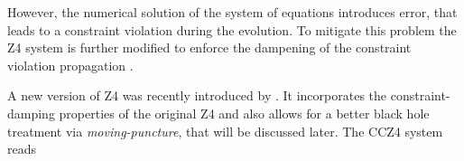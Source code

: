 \documentclass[11pt,a4paper,headinclude=true,DIV=14,BCOR=8mm,chapterprefix,listof=totoc,twoside,openright,abstracton]{scrbook}
\begin{document}
However, the numerical solution of the system of equations introduces error, that leads to a constraint violation during the evolution. To mitigate this problem the Z4 system is further modified to enforce the dampening of the constraint violation propagation \cite{Gundlach:2005eh}.

A new version of Z4 was recently introduced by \cite{Alic:2011gg}. It incorporates the constraint-damping properties of the original Z4 and also allows for a better black hole treatment via \textit{moving-puncture}, that will be discussed later. 
The CCZ4 system reads 

\end{document}
